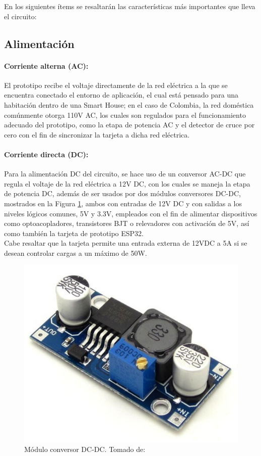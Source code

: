 En los siguientes ítems se resaltarán las características más importantes que lleva el circuito:\\

	\subsection{Alimentación}
	
	\paragraph{Corriente alterna (AC):}
		El prototipo recibe el voltaje directamente de la red eléctrica a la que se encuentra conectado el entorno de aplicación, el cual está pensado para una habitación dentro de una Smart House; en el caso de Colombia, la red doméstica comúnmente otorga 110V AC, los cuales son regulados para el funcionamiento adecuado del prototipo, como la etapa de potencia AC y el detector de cruce por cero con el fin de sincronizar la tarjeta a dicha red eléctrica.\\
		
	\paragraph{Corriente directa (DC):}
		Para la alimentación DC del circuito, se hace uso de un conversor AC-DC que regula el voltaje de la red eléctrica a 12V DC, con los cuales se maneja la etapa de potencia DC, además de ser usados por dos módulos conversores DC-DC, mostrados en la Figura \ref{fig:DCDC}, ambos con entradas de 12V DC y con salidas a los niveles lógicos comunes, 5V y 3.3V, empleados con el fin de alimentar dispositivos como optoacopladores, transistores BJT o relevadores con activación de 5V, así como también la tarjeta de prototipo ESP32.\\
		
		Cabe resaltar que la tarjeta permite una entrada externa de 12VDC a 5A si se desean controlar cargas a un máximo de 50W.\\
			
		\begin{figure}[H]
			\centering
			\caption{Módulo conversor DC-DC. Tomado de: \cite{DCDC}}
			\label{fig:DCDC}
			\includegraphics[width=0.5\linewidth]{Imagenes/DCDC}
		\end{figure}
	

